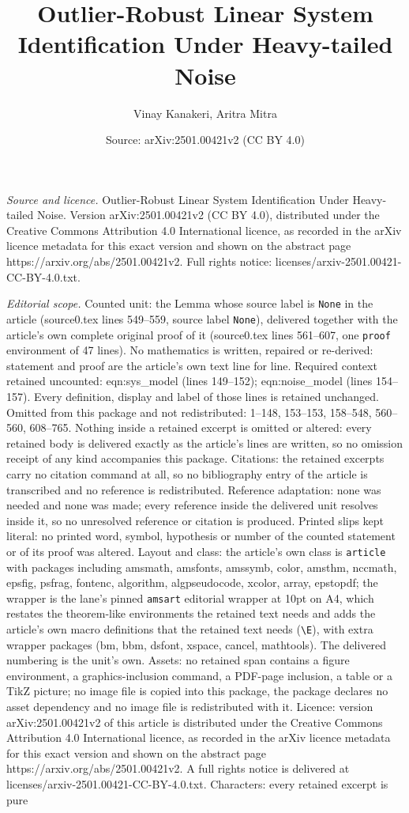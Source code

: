 \documentclass[10pt,a4paper]{amsart}
\title[Outlier-Robust Linear System Identification Under Heavy-tail]{Outlier-Robust Linear System Identification Under Heavy-tailed Noise}
\author{Vinay Kanakeri, Aritra Mitra}
\date{Source: arXiv:2501.00421v2 (CC BY 4.0)}
\begin{document}
\maketitle

\noindent\emph{Source and licence.} Outlier-Robust Linear System Identification Under Heavy-tailed Noise. Version arXiv:2501.00421v2 (CC BY 4.0), distributed under the Creative Commons Attribution 4.0 International licence, as recorded in the arXiv licence metadata for this exact version and shown on the abstract page https://arxiv.org/abs/2501.00421v2. Full rights notice: licenses/arxiv-2501.00421-CC-BY-4.0.txt.\par\smallskip

\noindent\textit{Editorial scope.} Counted unit: the Lemma whose source label is \texttt{None} in the article (source0.tex lines 549--559, source label \texttt{None}), delivered together with the article's own complete original proof of it (source0.tex lines 561--607, one \texttt{proof} environment of 47 lines). No mathematics is written, repaired or re-derived: statement and proof are the article's own text line for line. Required context retained uncounted: eqn:sys\_model (lines 149--152); eqn:noise\_model (lines 154--157). Every definition, display and label of those lines is retained unchanged. Omitted from this package and not redistributed: 1--148, 153--153, 158--548, 560--560, 608--765. Nothing inside a retained excerpt is omitted or altered: every retained body is delivered exactly as the article's lines are written, so no omission receipt of any kind accompanies this package. Citations: the retained excerpts carry no citation command at all, so no bibliography entry of the article is transcribed and no reference is redistributed. Reference adaptation: none was needed and none was made; every reference inside the delivered unit resolves inside it, so no unresolved reference or citation is produced. Printed slips kept literal: no printed word, symbol, hypothesis or number of the counted statement or of its proof was altered. Layout and class: the article's own class is \texttt{article} with packages including amsmath, amsfonts, amssymb, color, amsthm, nccmath, epsfig, psfrag, fontenc, algorithm, algpseudocode, xcolor, array, epstopdf; the wrapper is the lane's pinned \texttt{amsart} editorial wrapper at 10pt on A4, which restates the theorem-like environments the retained text needs and adds the article's own macro definitions that the retained text needs (\texttt{\textbackslash E}), with extra wrapper packages (bm, bbm, dsfont, xspace, cancel, mathtools). The delivered numbering is the unit's own. Assets: no retained span contains a figure environment, a graphics-inclusion command, a PDF-page inclusion, a table or a TikZ picture; no image file is copied into this package, the package declares no asset dependency and no image file is redistributed with it. Licence: version arXiv:2501.00421v2 of this article is distributed under the Creative Commons Attribution 4.0 International licence, as recorded in the arXiv licence metadata for this exact version and shown on the abstract page https://arxiv.org/abs/2501.00421v2. A full rights notice is delivered at licenses/arxiv-2501.00421-CC-BY-4.0.txt. Characters: every retained excerpt is pure 
\end{document}
